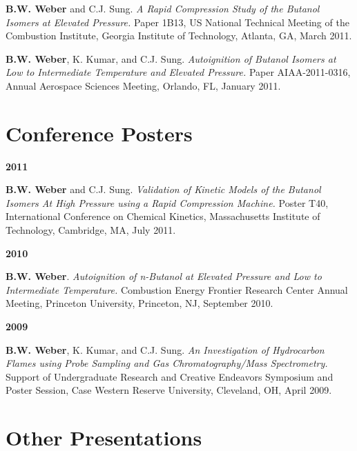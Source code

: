 \begin{bibsection}
\item[] \textbf{B.W. Weber} and C.J. Sung. \textit{A Rapid Compression
        Study of the Butanol Isomers at Elevated Pressure.} Paper 1B13,
          US National Technical Meeting of the Combustion
        Institute, Georgia Institute of Technology, Atlanta, GA, March
        2011.

\item[] \textbf{B.W. Weber}, K. Kumar, and C.J. Sung.
        \textit{Autoignition of Butanol Isomers at Low to Intermediate
        Temperature and Elevated Pressure.} Paper AIAA-2011-0316,
          Annual Aerospace Sciences Meeting,
        Orlando, FL, January 2011.
\end{bibsection}

\section{Conference Posters}

\begin{bibsection}
\item[] \textbf{2011}
\item[] \textbf{B.W. Weber} and C.J. Sung. \textit{Validation of
        Kinetic Models of the Butanol Isomers At High Pressure
        using a Rapid Compression Machine.} Poster T40,
         International Conference on Chemical Kinetics,
         Massachusetts Institute of Technology, Cambridge, MA,
         July 2011.

\item[] \textbf{2010}
\item[] \textbf{B.W. Weber}. \textit{Autoignition of n-Butanol at
        Elevated Pressure and Low to Intermediate Temperature.}
         Combustion Energy Frontier Research Center
        Annual Meeting, Princeton University, Princeton, NJ,
        September 2010.

\item[] \textbf{2009}
\item[] \textbf{B.W. Weber}, K. Kumar, and C.J. Sung. \textit{An
        Investigation of Hydrocarbon Flames using Probe Sampling and
        Gas Chromatography/Mass Spectrometry.} Support of Undergraduate
        Research and Creative Endeavors Symposium and Poster Session,
        Case Western Reserve University, Cleveland, OH, April 2009.
\end{bibsection}

\section{Other Presentations}

